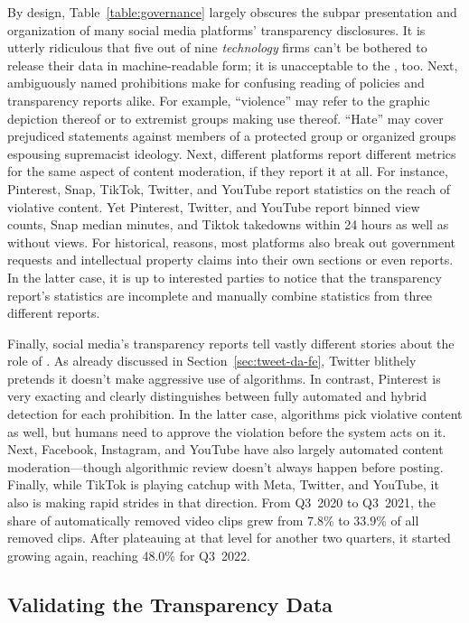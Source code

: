 By design, Table~\ref{table:governance} largely obscures the subpar presentation
and organization of many social media platforms' transparency disclosures. It is
utterly ridiculous that five out of nine \emph{technology} firms can't be
bothered to release their data in machine-readable form; it is unacceptable to
the , too. Next, ambiguously named prohibitions make for confusing reading of
policies and transparency reports alike. For example, ``violence'' may refer to
the graphic depiction thereof or to extremist groups making use thereof.
``Hate'' may cover prejudiced statements against members of a protected group or
organized groups espousing supremacist ideology. Next, different platforms
report different metrics for the same aspect of content moderation, if they
report it at all. For instance, Pinterest, Snap, TikTok, Twitter, and YouTube
report statistics on the reach of violative content. Yet Pinterest, Twitter, and
YouTube report binned view counts, Snap median minutes, and Tiktok takedowns
within 24 hours as well as without views. For historical, reasons, most
platforms also break out government requests and intellectual property claims
into their own sections or even reports. In the latter case, it is up to
interested parties to notice that the transparency report's statistics are
incomplete and manually combine statistics from three different reports.

Finally, social media's transparency reports tell vastly different stories about
the role of . As already discussed in Section~\ref{sec:tweet-da-fe}, Twitter
blithely pretends it doesn't make aggressive use of algorithms. In contrast,
Pinterest is very exacting and clearly distinguishes between fully automated and
hybrid detection for each prohibition. In the latter case, algorithms pick
violative content as well, but humans need to approve the violation before the
system acts on it. Next, Facebook, Instagram, and YouTube have also largely
automated content moderation---though algorithmic review doesn't always happen
before posting. Finally, while TikTok is playing catchup with Meta, Twitter, and
YouTube, it also is making rapid strides in that direction. From Q3~2020 to
Q3~2021, the share of automatically removed video clips grew from 7.8\% to
33.9\% of all removed clips. After plateauing at that level for another two
quarters, it started growing again, reaching 48.0\% for Q3~2022.


\subsection{Validating the Transparency Data}
\label{sec:census-validation}

